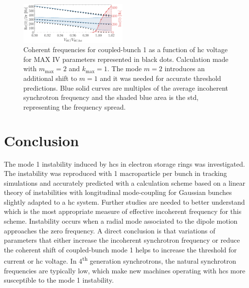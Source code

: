 \documentclass[a4paper,
               ]{jacow}
\begin{document}
\begin{figure}
    \centering
    \includegraphics[width=0.48\textwidth]{MOPS32_f4.pdf}
    \caption{Coherent frequencies for coupled-bunch 1 as a function of \gls{hc} voltage for MAX IV parameters represented in black dots. Calculation made with $m_\mathrm{max}=2$ and $k_\mathrm{max}=1$. The mode $m=2$ introduces an additional shift to $m=1$ and it was needed for accurate threshold predictions. Blue solid curves are multiples of the average incoherent synchrotron frequency and the shaded blue area is the std, representing the frequency spread.}
    \label{fig:6}
\end{figure}

\section{Conclusion}
The mode 1 instability induced by \glspl{hc} in electron storage rings was investigated. The instability was reproduced with 1 macroparticle per bunch in tracking simulations and accurately predicted with a calculation scheme based on a linear theory of instabilities with longitudinal mode-coupling for Gaussian bunches slightly adapted to a \gls{hc} system. Further studies are needed to better understand which is the most appropriate measure of effective incoherent frequency for this scheme. Instability occurs when a radial mode associated to the dipole motion approaches the zero frequency. A direct conclusion is that variations of parameters that either increase the incoherent synchrotron frequency or reduce the coherent shift of coupled-bunch mode 1 helps to increase the threshold for current or \gls{hc} voltage. In 4\textsuperscript{th} generation synchrotrons, the natural synchrotron frequencies are typically low, which make new machines operating with \glspl{hc} more susceptible to the mode 1 instability.
\end{document}
